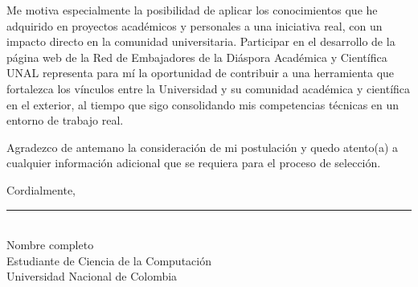 \documentclass[11pt]{letter}
\begin{document}
Me motiva especialmente la posibilidad de aplicar los conocimientos que he adquirido en proyectos académicos y personales a una iniciativa real, con un impacto directo en la comunidad universitaria. Participar en el desarrollo de la página web de la Red de Embajadores de la Diáspora Académica y Científica UNAL representa para mí la oportunidad de contribuir a una herramienta que fortalezca los vínculos entre la Universidad y su comunidad académica y científica en el exterior, al tiempo que sigo consolidando mis competencias técnicas en un entorno de trabajo real.

Agradezco de antemano la consideración de mi postulación y quedo atento(a) a cualquier información adicional que se requiera para el proceso de selección.

\vspace{0.3cm}

Cordialmente,

\vspace{1.5cm}

\rule{7cm}{0.4pt} \\
Nombre completo \\
Estudiante de Ciencia de la Computación \\
Universidad Nacional de Colombia
\end{document}
